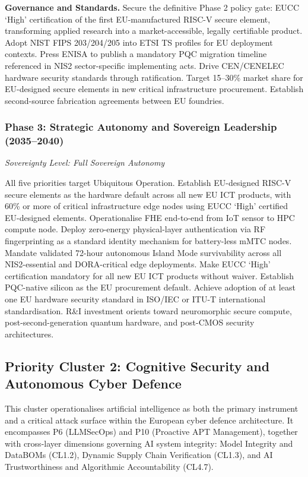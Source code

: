 \documentclass{ieeeaccess}
\begin{document}
\textbf{Governance and Standards.} Secure the definitive Phase 2 policy
gate: EUCC `High' certification of the first EU-manufactured RISC-V
secure element, transforming applied research into a market-accessible,
legally certifiable product. Adopt NIST FIPS 203/204/205 into ETSI TS
profiles for EU deployment contexts. Press ENISA to publish a mandatory
PQC migration timeline referenced in NIS2 sector-specific implementing
acts. Drive CEN/CENELEC hardware security standards through
ratification. Target 15--30\% market share for EU-designed secure
elements in new critical infrastructure procurement. Establish
second-source fabrication agreements between EU foundries.

\subsubsection{Phase 3: Strategic Autonomy and Sovereign Leadership
(2035--2040)}\label{phase-3-strategic-autonomy-and-sovereign-leadership-20352040}

\emph{Sovereignty Level: Full Sovereign Autonomy}

All five priorities target Ubiquitous Operation. Establish EU-designed
RISC-V secure elements as the hardware default across all new EU ICT
products, with 60\% or more of critical infrastructure edge nodes using
EUCC `High' certified EU-designed elements. Operationalise FHE
end-to-end from IoT sensor to HPC compute node. Deploy zero-energy
physical-layer authentication via RF fingerprinting as a standard
identity mechanism for battery-less mMTC nodes. Mandate validated
72-hour autonomous Island Mode survivability across all NIS2-essential
and DORA-critical edge deployments. Make EUCC `High' certification
mandatory for all new EU ICT products without waiver. Establish
PQC-native silicon as the EU procurement default. Achieve adoption of at
least one EU hardware security standard in ISO/IEC or ITU-T
international standardisation. R\&I investment orients toward
neuromorphic secure compute, post-second-generation quantum hardware,
and post-CMOS security architectures.

\subsection{Priority Cluster 2: Cognitive Security and Autonomous
Cyber
Defence}\label{priority-cluster-2-cognitive-security-and-autonomous-cyber-defence}

This cluster operationalises artificial intelligence as both the primary
instrument and a critical attack surface within the European cyber
defence architecture. It encompasses P6 (LLMSecOps) and P10 (Proactive
APT Management), together with cross-layer dimensions governing AI
system integrity: Model Integrity and DataBOMs (CL1.2), Dynamic Supply
Chain Verification (CL1.3), and AI Trustworthiness and Algorithmic
Accountability (CL4.7).
\end{document}
